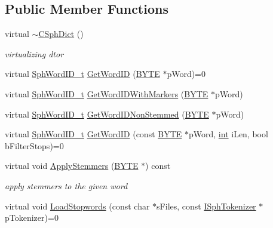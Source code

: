 \subsection*{Public Member Functions}
\begin{DoxyCompactItemize}
\item 
virtual \hyperlink{classCSphDict_a4715cb36be1d9d21ca3f89f80385e099}{$\sim$\-C\-Sph\-Dict} ()
\begin{DoxyCompactList}\small\item\em virtualizing dtor \end{DoxyCompactList}\item 
virtual \hyperlink{sphinx_8h_a80a94d5984fdf9214a98f3e5e65df963}{Sph\-Word\-I\-D\-\_\-t} \hyperlink{classCSphDict_a3965d691a170a6fec615cb0c048c9186}{Get\-Word\-I\-D} (\hyperlink{sphinxstd_8h_a4ae1dab0fb4b072a66584546209e7d58}{B\-Y\-T\-E} $\ast$p\-Word)=0
\item 
virtual \hyperlink{sphinx_8h_a80a94d5984fdf9214a98f3e5e65df963}{Sph\-Word\-I\-D\-\_\-t} \hyperlink{classCSphDict_a66f4ee1853964dbcb77724c9462c6dbf}{Get\-Word\-I\-D\-With\-Markers} (\hyperlink{sphinxstd_8h_a4ae1dab0fb4b072a66584546209e7d58}{B\-Y\-T\-E} $\ast$p\-Word)
\item 
virtual \hyperlink{sphinx_8h_a80a94d5984fdf9214a98f3e5e65df963}{Sph\-Word\-I\-D\-\_\-t} \hyperlink{classCSphDict_a51955c35adb9310b1267fd702518302a}{Get\-Word\-I\-D\-Non\-Stemmed} (\hyperlink{sphinxstd_8h_a4ae1dab0fb4b072a66584546209e7d58}{B\-Y\-T\-E} $\ast$p\-Word)
\item 
virtual \hyperlink{sphinx_8h_a80a94d5984fdf9214a98f3e5e65df963}{Sph\-Word\-I\-D\-\_\-t} \hyperlink{classCSphDict_a0c4412079431495b1000a486d6fa3c6f}{Get\-Word\-I\-D} (const \hyperlink{sphinxstd_8h_a4ae1dab0fb4b072a66584546209e7d58}{B\-Y\-T\-E} $\ast$p\-Word, \hyperlink{sphinxexpr_8cpp_a4a26e8f9cb8b736e0c4cbf4d16de985e}{int} i\-Len, bool b\-Filter\-Stops)=0
\item 
virtual void \hyperlink{classCSphDict_ac5a6e1607403c264e139b58cce21fb64}{Apply\-Stemmers} (\hyperlink{sphinxstd_8h_a4ae1dab0fb4b072a66584546209e7d58}{B\-Y\-T\-E} $\ast$) const 
\begin{DoxyCompactList}\small\item\em apply stemmers to the given word \end{DoxyCompactList}\item 
virtual void \hyperlink{classCSphDict_a99464288e57c4c5519b481d9086a5a63}{Load\-Stopwords} (const char $\ast$s\-Files, const \hyperlink{classISphTokenizer}{I\-Sph\-Tokenizer} $\ast$p\-Tokenizer)=0

\end{DoxyCompactItemize}
